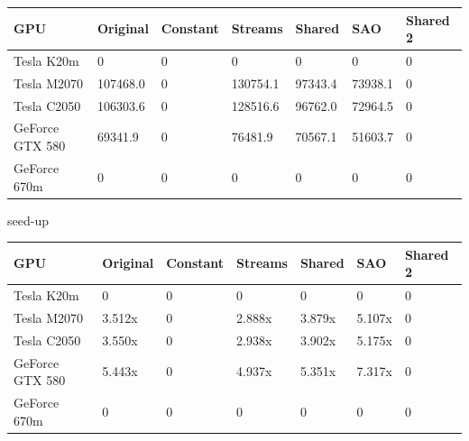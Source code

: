 \begin{table}[h]
\centering
  \begin{tabular} { |  l  |  l | l  |  l  | l | l | l |}
    \hline
    GPU & Original & Constant & Streams & Shared & SAO & Shared 2 \\
    \hline
    Tesla K20m & 0 & 0 & 0 & 0 & 0 & 0\\
   \hline
    Tesla M2070 & 107468.0 & 0 & 130754.1 & 97343.4 & 73938.1 & 0\\
    \hline
    Tesla C2050 & 106303.6 & 0 & 128516.6 & 96762.0 & 72964.5 & 0\\
   \hline
    GeForce GTX 580 & 69341.9 & 0 & 76481.9 & 70567.1 & 51603.7 & 0\\
   \hline
    GeForce 670m & 0 & 0 & 0 & 0 & 0 & 0\\
   \hline
  \end{tabular}
  \end{table}
  
  
  seed-up
  \begin{table}[h]
\centering
  \begin{tabular} { |  l  |  l | l  |  l  | l | l | l |}
    \hline
    GPU & Original & Constant & Streams & Shared & SAO & Shared 2 \\
    \hline
    Tesla K20m & 0 & 0 & 0 & 0 & 0 & 0\\
   \hline
    Tesla M2070 & 3.512x & 0 & 2.888x & 3.879x & 5.107x & 0\\
    \hline
    Tesla C2050 & 3.550x & 0 & 2.938x & 3.902x & 5.175x & 0\\
   \hline
    GeForce GTX 580 & 5.443x & 0 & 4.937x & 5.351x & 7.317x & 0\\
   \hline
    GeForce 670m & 0 & 0 & 0 & 0 & 0 & 0\\
   \hline
  \end{tabular}
  \end{table}
  
